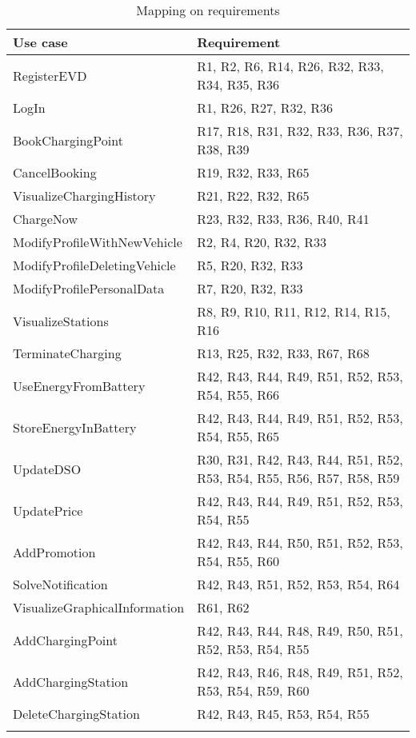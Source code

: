 \begin{center}
    \begin{longtable}[H]{|p{0.4\linewidth}|p{0.6\linewidth}|}
     \hline
     \textbf{Use case} & \textbf{Requirement}\\
     \hline
     RegisterEVD & R1, R2, R6, R14, R26, R32, R33, R34, R35, R36 \\
     \hline
     LogIn & R1, R26, R27, R32, R36 \\
     \hline
     BookChargingPoint & R17, R18, R31, R32, R33, R36, R37, R38, R39 \\
     \hline
     CancelBooking &  R19, R32, R33, R65 \\
     \hline
     VisualizeChargingHistory & R21, R22, R32, R65 \\
     \hline
     ChargeNow & R23, R32, R33, R36, R40, R41 \\
     \hline
     ModifyProfileWithNewVehicle & R2, R4, R20, R32, R33 \\
     \hline
     ModifyProfileDeletingVehicle & R5, R20, R32, R33 \\
     \hline
     ModifyProfilePersonalData & R7, R20, R32, R33 \\
     \hline
     VisualizeStations & R8, R9, R10, R11, R12, R14, R15, R16 \\
     \hline
     TerminateCharging & R13, R25, R32, R33, R67, R68\\
     \hline
     UseEnergyFromBattery & R42, R43, R44, R49, R51, R52, R53, R54, R55, R66 \\
     \hline
     StoreEnergyInBattery & R42, R43, R44, R49, R51, R52, R53, R54, R55, R65\\
     \hline
     UpdateDSO & R30, R31, R42, R43, R44, R51, R52, R53, R54, R55, R56, R57, R58, R59 \\
     \hline
     UpdatePrice & R42, R43, R44, R49, R51, R52, R53, R54, R55\\
     \hline
     AddPromotion & R42, R43, R44, R50, R51, R52, R53, R54, R55, R60 \\
     \hline
     SolveNotification & R42, R43, R51, R52, R53, R54, R64\\
     \hline
     VisualizeGraphicalInformation & R61, R62 \\
     \hline
     AddChargingPoint & R42, R43, R44, R48, R49, R50, R51, R52, R53, R54, R55 \\
     \hline
     AddChargingStation & R42, R43, R46, R48, R49, R51, R52, R53, R54, R59, R60 \\
     \hline
     DeleteChargingStation & R42, R43, R45, R53, R54, R55 \\
     \hline
    \caption{Mapping on requirements}
    \label{tab:Mapping on requirements}
    \end{longtable}
\end{center}